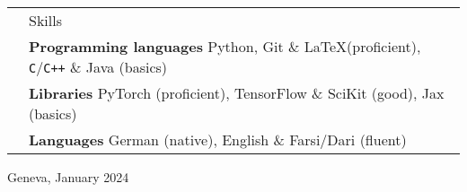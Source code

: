 \documentclass[11pt, a4paper]{article}
\newcommand{\headingfont}{\Large\color{OliveGreen}}
\newenvironment{SectionTable}[1]{
	\renewcommand*{\arraystretch}{1.7}
	\setlength{\tabcolsep}{10pt}
	\begin{longtable}{Rp{5.2in}} & #1 \\}
	{\end{longtable}\vspace{-.3cm}}
\begin{document}
    \begin{SectionTable}{\headingfont Skills}
		& \textbf{Programming languages} \newline
		Python, Git \& \LaTeX (proficient), \texttt{C}/\texttt{C++} \& Java (basics) \\
        
        & \textbf{Libraries} \newline
        PyTorch (proficient), TensorFlow \& SciKit (good), Jax (basics) \\
		
		& \textbf{Languages} \newline
		German (native), English \& Farsi/Dari (fluent)
	\end{SectionTable}
		
	\vspace{0.6cm}
	Geneva, January 2024
	
\end{document}
